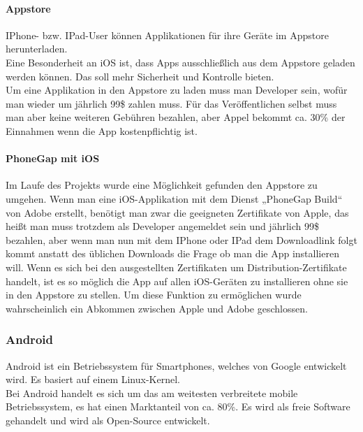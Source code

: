 \paragraph*{Appstore\\}
IPhone- bzw. IPad-User können Applikationen für ihre Geräte im Appstore herunterladen.\\ 
Eine Besonderheit an iOS ist, dass Apps ausschließlich aus dem Appstore geladen werden können. Das soll mehr Sicherheit und Kontrolle bieten.\\
Um eine Applikation in den Appstore zu laden muss man Developer sein, wofür man wieder um jährlich 99\$ zahlen muss. Für das Veröffentlichen selbst muss man aber keine weiteren Gebühren bezahlen, aber Appel bekommt ca. 30\% der Einnahmen wenn die App kostenpflichtig ist.\\
\paragraph*{PhoneGap mit iOS\\}
Im Laufe des Projekts wurde eine Möglichkeit gefunden den Appstore zu umgehen. Wenn man eine iOS-Applikation mit dem Dienst „PhoneGap Build“ von Adobe erstellt, benötigt man zwar die geeigneten Zertifikate von Apple, das heißt man muss trotzdem als Developer angemeldet sein und jährlich 99\$ bezahlen, aber wenn man nun mit dem IPhone oder IPad dem Downloadlink folgt kommt anstatt des üblichen Downloads die Frage ob man die App installieren will.
Wenn es sich bei den ausgestellten Zertifikaten um Distribution-Zertifikate handelt, ist es so möglich die App auf allen iOS-Geräten zu installieren ohne sie in den Appstore zu stellen. Um diese Funktion zu ermöglichen wurde wahrscheinlich ein Abkommen zwischen Apple und Adobe geschlossen.\\

\subsubsection{Android}
Android ist ein Betriebssystem für Smartphones, welches von Google entwickelt wird. Es basiert auf einem Linux-Kernel.\\
Bei Android handelt es sich um das am weitesten verbreitete mobile Betriebssystem, es hat einen Marktanteil von ca. 80\%. Es wird als freie Software gehandelt und wird als Open-Source entwickelt.\\
\\
